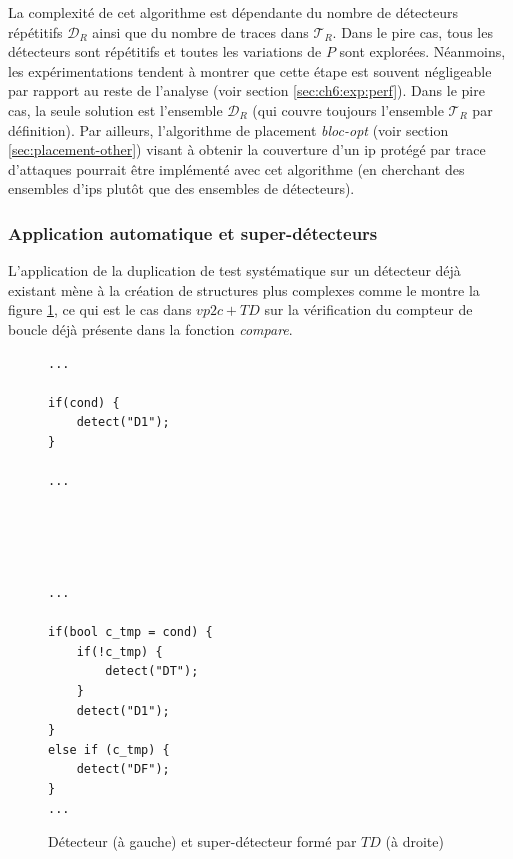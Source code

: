                 La complexité de cet algorithme est dépendante du nombre de détecteurs répétitifs $\mathcal{D}_{R}$ ainsi que du nombre de traces dans $\mathcal{T}_{R}$.
                Dans le pire cas, tous les détecteurs sont répétitifs et toutes les variations de $P$ sont explorées.
                Néanmoins, les expérimentations tendent à montrer que cette étape est souvent négligeable par rapport au reste de l'analyse (voir section \ref{sec:ch6:exp:perf}).
                Dans le pire cas, la seule solution est l'ensemble $\mathcal{D}_R$ (qui couvre toujours l'ensemble $\mathcal{T}_R$ par définition).
                Par ailleurs, l'algorithme de placement \textit{bloc-opt} (voir section \ref{sec:placement-other}) visant à obtenir la couverture d'un \gls{ip} protégé par trace d'attaques pourrait être implémenté avec cet algorithme (en cherchant des ensembles d'\gls{ip}s plutôt que des ensembles de détecteurs).
    
            \subsubsection{Application automatique et super-détecteurs}
            \label{sec:ch6-supdect}
    
                L'application de la duplication de test systématique sur un détecteur déjà existant mène à la création de structures plus complexes comme le montre la figure \ref{fig:super-detect}, ce qui est le cas dans $vp2c+TD$ sur la vérification du compteur de boucle déjà présente dans la fonction \textit{compare}.                    
       
                \begin{figure}[H]\centering
                \begin{multicols}{2}
\begin{lstlisting}
...

if(cond) {
    detect("D1");
} 

...





\end{lstlisting}  
\columnbreak

\begin{lstlisting}
...

if(bool c_tmp = cond) { 
    if(!c_tmp) {
        detect("DT");
    }
    detect("D1");
}
else if (c_tmp) {
    detect("DF");
}
...\end{lstlisting}  
\end{multicols}
                \caption{Détecteur (à gauche) et super-détecteur formé par $TD$ (à droite) \label{fig:super-detect}}
                \end{figure}
            
